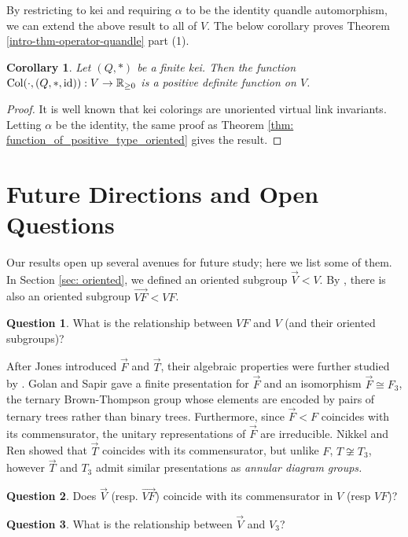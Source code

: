 \documentclass[11pt, twoside]{amsart}
\numberwithin{equation}{section}
\newtheorem{corollary}[theorem]{Corollary}
\theoremstyle{definition}
\newtheorem{question}{Question}[section]
\numberwithin{equation}{section}
\begin{document}
By restricting to kei and requiring $\alpha$ to be the identity quandle automorphism, we can extend the above result to all of $V$. The below corollary proves Theorem \ref{intro-thm-operator-quandle} part (1).

\begin{corollary}
    Let $(Q,*)$ be a finite kei. Then the function $\text{Col}(\cdot, (Q,*,\textup{id})):V \to \mathbb{R}_{\geq 0}$ is a positive definite function on $V$.
\end{corollary}

\begin{proof}
   It is well known that kei colorings are unoriented virtual link invariants. Letting $\alpha$ be the identity, the same proof as Theorem \ref{thm: function_of_positive_type_oriented} gives the result.
\end{proof}

\section{Future Directions and Open Questions}\label{sec: openq}
Our results open up several avenues for future study; here we list some of them. In Section \ref{sec: oriented}, we defined an oriented subgroup $\vec{V} < V$. By \cite{KTVF}, there is also an oriented subgroup $\vec{\mathit{VF}} < \mathit{VF}$. 
\begin{question} What is the relationship between $\mathit{VF}$ and $V$ (and their oriented subgroups)?
\end{question} 
After Jones introduced $\vec{F}$ and $\vec{T}$, their algebraic properties were further studied by \cite{golansapir, nikkelren}. Golan and Sapir \cite{golansapir} gave a finite presentation for $\vec{F}$ and an isomorphism $\vec{F}\cong F_{3}$, the ternary Brown-Thompson group whose elements are encoded by pairs of ternary trees rather than binary trees. Furthermore, since $\vec{F}<F$ coincides with its commensurator, the unitary representations of $\vec{F}$ are irreducible. Nikkel and Ren \cite{nikkelren} showed that $\vec{T}$ coincides with its commensurator, but unlike $F$, $T\not\cong T_3$, however $\vec{T}$ and $T_3$ admit similar presentations as \textit{annular diagram groups.} 
\begin{question}
    Does $\vec{V}$ (resp. $\vec{\mathit{VF}}$) coincide with its commensurator in $V$ (resp $\mathit{VF}$)?
\end{question}

\begin{question} What is the relationship between $\vec{V}$ and $V_3$?
\end{question}
\end{document}
